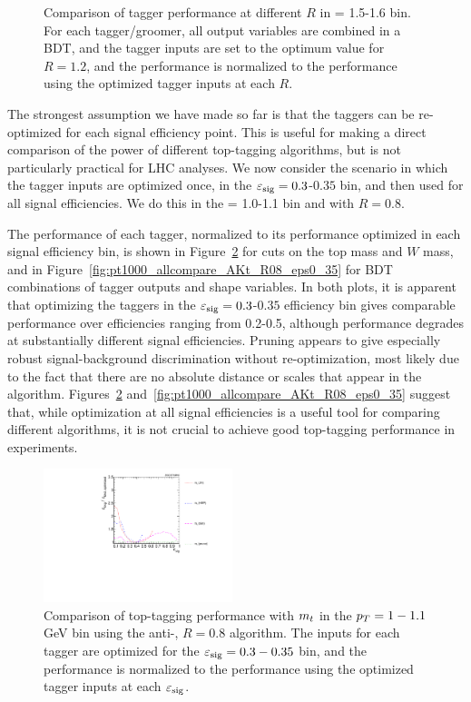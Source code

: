 \begin{figure}
\caption{Comparison of tagger performance at different $R$ in \pt = 1.5-1.6 \TeV bin. For each tagger/groomer, all output variables are combined in a BDT, and the tagger inputs are set to the optimum value for $R=1.2$, and the performance is normalized to the performance using the optimized tagger inputs at each $R$.}
\label{fig:Rcomparison_top_optOnce}
\end{figure}


The strongest assumption we have made so far is that the taggers can be re-optimized for each signal efficiency point. This is useful for making a direct comparison of the power of different top-tagging algorithms, but is not particularly practical for LHC analyses. We now consider the scenario in which the tagger inputs are optimized once, in the $\varepsilon_{\rm sig}=0.3$-$0.35$ bin, and then used for all signal efficiencies. We do this in the  \pt = 1.0-1.1 \TeV bin and with $R=0.8$.

The performance of each tagger, normalized to its performance optimized in each signal efficiency bin, is shown in Figure~\ref{fig:single_variable_ROC_eps0_35} for cuts on the top mass and $W$ mass, and in Figure~\ref{fig:pt1000_allcompare_AKt_R08_eps0_35} for BDT combinations of tagger outputs and shape variables. In both plots, it is apparent that optimizing the taggers in the $\varepsilon_{\rm sig}=0.3$-$0.35$ efficiency bin gives comparable performance over efficiencies ranging from 0.2-0.5, although performance degrades at substantially different signal efficiencies. Pruning appears to give especially robust signal-background discrimination without re-optimization, most likely due to the fact that there are no absolute distance or \pt scales that appear in the algorithm. Figures~\ref{fig:single_variable_ROC_eps0_35} and~\ref{fig:pt1000_allcompare_AKt_R08_eps0_35} suggest that, while optimization at all signal efficiencies is a useful tool for comparing different algorithms, it is not crucial to achieve good top-tagging performance in experiments.

\begin{figure}
\centering
\includegraphics[width=0.49\textwidth]{./Figures/TTagging/single_variable/pT.1TeV.R.0.8/Rocs_top_mass_eff0_35.pdf}
\caption{Comparison of  top-tagging performance with $m_{t}$ in the $p_T= 1-1.1$ GeV bin using the anti-\kT, $R=0.8$ algorithm. The inputs for each tagger are optimized for the $\varepsilon_{\rm sig}=0.3-0.35$ bin, and the performance is normalized to the performance using the optimized tagger inputs at each $\varepsilon_{\rm sig}$.}
\label{fig:single_variable_ROC_eps0_35}
\end{figure}

